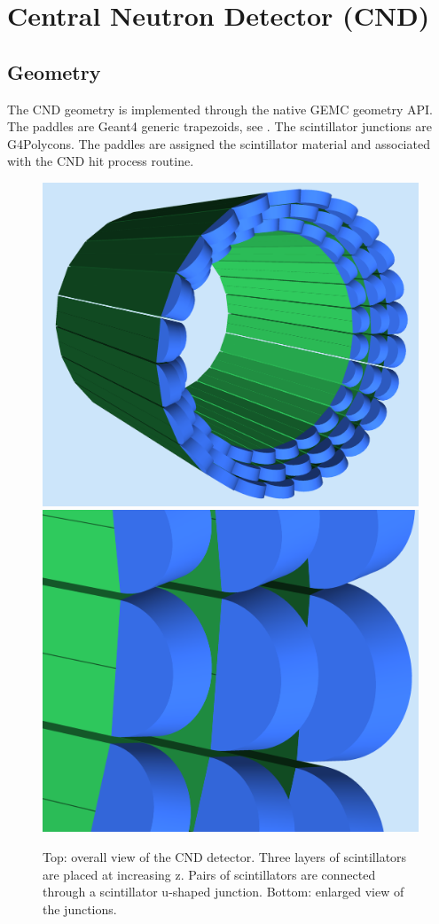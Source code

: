 \section{Central Neutron Detector (CND)}

\subsection{Geometry}

The CND geometry is implemented through the native GEMC geometry API.
The paddles are Geant4 generic trapezoids, see . The scintillator junctions are G4Polycons.
The paddles are assigned the scintillator material and associated with the CND hit process routine.

\begin{figure}
	\centering
	\includegraphics[width=0.95\columnwidth,keepaspectratio]{img/cndGeometry.png}
	\includegraphics[width=0.95\columnwidth,keepaspectratio]{img/cndDetail.png}
	\caption{Top: overall view of the CND detector. Three layers of scintillators are placed at increasing z. Pairs of scintillators
            are connected through a scintillator u-shaped junction. Bottom: enlarged view of the junctions. }
	\label{fig:cndGeometry}
\end{figure}


